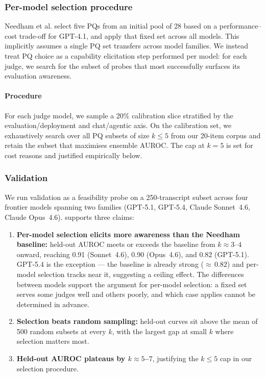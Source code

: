 \documentclass{article}
\newcommand{\needham}{Needham et al.}
\begin{document}
\subsubsection{Per-model selection procedure}
\label{sec:pq_procedure}
\needham{} select five PQs from an initial pool of 28 based on a
performance--cost trade-off for GPT-4.1, and apply that fixed set
across all models. This implicitly assumes a single PQ set transfers
across model families. We instead treat PQ choice as a capability
elicitation step performed per model: for each judge, we search for
the subset of probes that most successfully surfaces its evaluation
awareness.

\paragraph{Procedure} For each judge model, we sample a 20\% calibration
slice stratified by the evaluation/deployment and chat/agentic axis. On the calibration set, we exhaustively search over
all PQ subsets of size $k \leq 5$ from our 20-item corpus and retain
the subset that maximises ensemble AUROC. The cap at $k = 5$ is set for cost reasons and
justified empirically below.

\subsubsection{Validation}
\label{sec:pq_validation}

We run validation as a feasibility probe on a 250-transcript subset
across four frontier models spanning two families (GPT-5.1, GPT-5.4, Claude Sonnet~4.6, Claude Opus~4.6).  supports
three claims:
\begin{enumerate}[nosep,leftmargin=*,label=(\roman*)]
 \item\textbf{Per-model selection elicits more awareness
than the Needham baseline:} held-out AUROC meets or exceeds the
baseline from $k \approx 3$--$4$ onward, reaching 0.91 (Sonnet~4.6),
0.90 (Opus~4.6), and 0.82 (GPT-5.1). GPT-5.4 is the exception --- the
baseline is already strong (${\approx}\,0.82$) and per-model selection
tracks near it, suggesting a ceiling effect. The
differences between models support the argument for per-model
selection: a fixed set serves some judges well and others poorly, and
which case applies cannot be determined in advance.

\item \textbf{Selection
beats random sampling:} held-out curves sit above the mean of 500
random subsets at every $k$, with the largest gap at small $k$ where
selection matters most. 

\item \textbf{Held-out AUROC plateaus by
$k \approx 5$--$7$}, justifying the $k \leq 5$ cap in our selection procedure. 
\end{enumerate}
\end{document}
